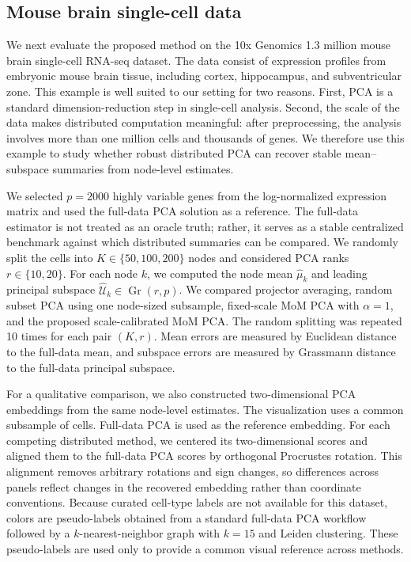 \documentclass[11pt]{article}
\newcommand{\Gr}{\operatorname{Gr}}
\begin{document}
\subsection{Mouse brain single-cell data}
\label{subsec:real-mouse}

We next evaluate the proposed method on the 10x Genomics 1.3 million mouse brain single-cell RNA-seq dataset.  The data consist of expression profiles from embryonic mouse brain tissue, including cortex, hippocampus, and subventricular zone.  This example is well suited to our setting for two reasons.  First, PCA is a standard dimension-reduction step in single-cell analysis.  Second, the scale of the data makes distributed computation meaningful: after preprocessing, the analysis involves more than one million cells and thousands of genes.  We therefore use this example to study whether robust distributed PCA can recover stable mean--subspace summaries from node-level estimates.

We selected \(p=2000\) highly variable genes from the log-normalized expression matrix and used the full-data PCA solution as a reference.  The full-data estimator is not treated as an oracle truth; rather, it serves as a stable centralized benchmark against which distributed summaries can be compared.  We randomly split the cells into \(K\in\{50,100,200\}\) nodes and considered PCA ranks \(r\in\{10,20\}\).  For each node \(k\), we computed the node mean \(\widehat\mu_k\) and leading principal subspace \(\widehat{\mathcal U}_k\in\Gr(r,p)\).  We compared projector averaging, random subset PCA using one node-sized subsample, fixed-scale MoM PCA with \(\alpha=1\), and the proposed scale-calibrated MoM PCA.  The random splitting was repeated 10 times for each pair \((K,r)\).  Mean errors are measured by Euclidean distance to the full-data mean, and subspace errors are measured by Grassmann distance to the full-data principal subspace.


For a qualitative comparison, we also constructed two-dimensional PCA embeddings from the same node-level estimates.  The visualization uses a common subsample of cells.  Full-data PCA is used as the reference embedding.  For each competing distributed method, we centered its two-dimensional scores and aligned them to the full-data PCA scores by orthogonal Procrustes rotation.  This alignment removes arbitrary rotations and sign changes, so differences across panels reflect changes in the recovered embedding rather than coordinate conventions.  Because curated cell-type labels are not available for this dataset, colors are pseudo-labels obtained from a standard full-data PCA workflow followed by a \(k\)-nearest-neighbor graph with $k=15$ and Leiden clustering.  These pseudo-labels are used only to provide a common visual reference across methods.
\end{document}
